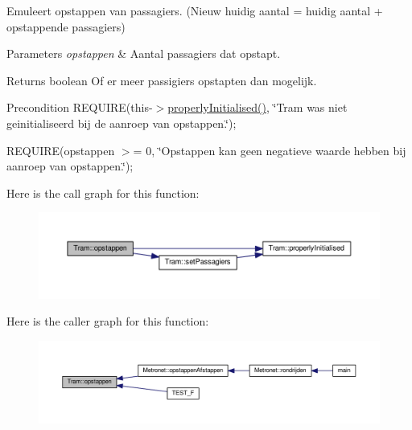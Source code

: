 Emuleert opstappen van passagiers. (Nieuw huidig aantal = huidig aantal + opstappende passagiers) 


\begin{DoxyParams}{Parameters}
{\em opstappen} & Aantal passagiers dat opstapt. \\
\hline
\end{DoxyParams}
\begin{DoxyReturn}{Returns}
boolean Of er meer passigiers opstapten dan mogelijk. 
\end{DoxyReturn}
\begin{DoxyPrecond}{Precondition}
R\+E\+Q\+U\+I\+RE(this-\/$>$\hyperlink{class_tram_ac2688f590e4db232b4f535c9bf959efb}{properly\+Initialised()}, \char`\"{}\+Tram was niet geinitialiseerd bij de aanroep van opstappen.\char`\"{}); 

R\+E\+Q\+U\+I\+RE(opstappen $>$= 0, \char`\"{}\+Opstappen kan geen negatieve waarde hebben bij aanroep van opstappen.\char`\"{}); 
\end{DoxyPrecond}
Here is the call graph for this function\+:\nopagebreak
\begin{figure}[H]
\begin{center}
\leavevmode
\includegraphics[width=350pt]{class_tram_aaeb00c535a6854f85dcc42cdff97ad0c_cgraph}
\end{center}
\end{figure}
Here is the caller graph for this function\+:\nopagebreak
\begin{figure}[H]
\begin{center}
\leavevmode
\includegraphics[width=350pt]{class_tram_aaeb00c535a6854f85dcc42cdff97ad0c_icgraph}
\end{center}
\end{figure}
\mbox{\label{class_tram_ac2688f590e4db232b4f535c9bf959efb}} 
